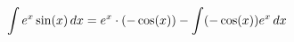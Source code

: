 \documentclass[preview]{standalone}
\begin{document}
\begin{align*}
\special{dvisvgm:raw <g id='unique000'>}\int e^x \sin(x) \, dx = e^x \cdot (-\cos(x)) - \int (-\cos(x)) e^x \, dx\special{dvisvgm:raw </g>}
\end{align*}
\end{document}
